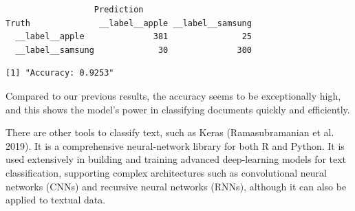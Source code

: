 \begin{Shaded}
\begin{Highlighting}[]
\OtherTok{\textless{}{-}} \NormalTok{(}\NormalTok{)}
\OtherTok{\textless{}{-}}  \NormalTok{(}\NormalTok{(}\NormalTok{, }\SpecialCharTok{$} 

\OtherTok{\textless{}{-}} \NormalTok{(} \NormalTok{(}\NormalTok{, }\SpecialCharTok{$}
                          \SpecialCharTok{$}
\end{Highlighting}
\end{Shaded}

\begin{verbatim}
                  Prediction
Truth              __label__apple __label__samsung
  __label__apple              381               25
  __label__samsung             30              300
\end{verbatim}

\begin{Shaded}
\begin{Highlighting}[]
\OtherTok{\textless{}{-}} \NormalTok{(}\SpecialCharTok{/} 
\NormalTok{(}\NormalTok{(}
\end{Highlighting}
\end{Shaded}

\begin{verbatim}
[1] "Accuracy: 0.9253"
\end{verbatim}

Compared to our previous results, the accuracy seems to be
exceptionally high, and this shows the model's power in classifying
documents quickly and efficiently.

There are other tools to classify text, such as Keras (Ramasubramanian
et al. 2019). It is a comprehensive neural-network library for both R
and Python. It is used extensively in building and training advanced
deep-learning models for text classification, supporting complex
architectures such as convolutional neural networks (CNNs) and recursive
neural networks (RNNs), although it can also be applied to textual data.

